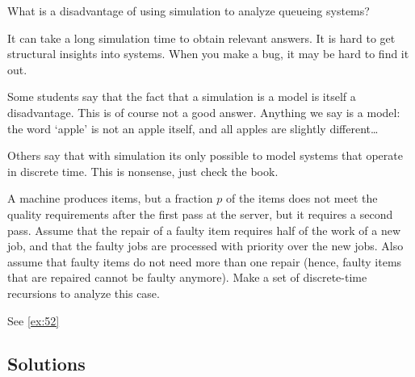 \begin{exercise}[201807]{1}
  What is a disadvantage of using simulation to analyze queueing systems?
\begin{solution}
    It can take a long simulation time to obtain relevant answers. It is hard to get structural insights into systems. When you make a bug, it may be hard to find it out.

Some students say that the fact that a simulation is a model is itself a disadvantage. This is of course not a good answer. Anything we say is a model: the word `apple' is not an apple itself, and all apples are slightly different\ldots 

Others say that with simulation its only possible to model systems that operate in discrete time. This is nonsense, just check the book. 
\end{solution}
\end{exercise}


\begin{exercise}[201904, 2]
  A machine produces items, but a fraction $p$ of the items does not meet the quality requirements after the first pass at the server, but it requires a second pass.
  Assume that the repair of a faulty item requires half of the work of a new job, and that the faulty jobs are processed with priority over the new jobs.
  Also assume that faulty items do not need more than one repair (hence, faulty items that are repaired cannot be faulty anymore).
  Make a set of discrete-time recursions to analyze this case.
\begin{solution}
See \ref{ex:52}
\end{solution}
\end{exercise}


\subsection*{Solutions}




